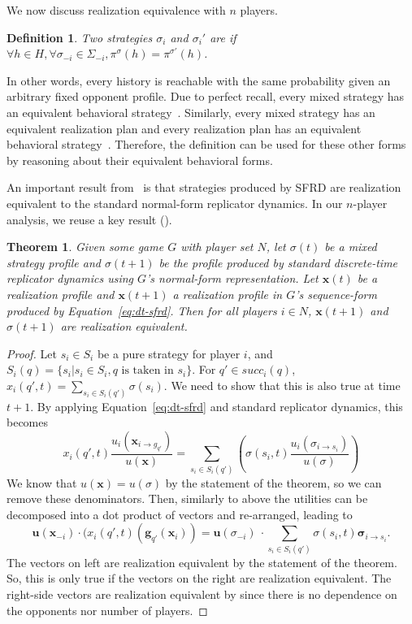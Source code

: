 \documentclass{aamas2014}
\newcommand{\bx}{\mathbf{x}}
\newcommand{\bg}{\mathbf{g}}
\newcommand{\bu}{\mathbf{u}}
\newcommand{\defword}[1]{\textbf{\boldmath{#1}}}
\newtheorem{definition}{Definition}
\newtheorem{theorem}{Theorem}
\newcommand{\todo}[1]{{\color{red}{\bf #1}}}
\begin{document}
\noindent We now discuss realization equivalence with $n$ players. 
\begin{definition}
Two strategies $\sigma_i$ and $\sigma_i'$ are \defword{realization equivalent} if 
$\forall h \in H, \forall \sigma_{-i} \in \Sigma_{-i}, \pi^{\sigma}(h) = \pi^{\sigma'}(h)$. 
\end{definition}
In other words, every history is reachable with the same probability given an arbitrary fixed opponent profile. 
Due to perfect recall, every mixed strategy has an equivalent behavioral strategy~\cite{Kuhn53}. 
Similarly, every mixed strategy has an equivalent realization plan and every realization plan has 
an equivalent behavioral strategy~\cite{SequenceFormLPs}. Therefore, the definition can be used for these 
other forms by reasoning about their equivalent behavioral forms. 

An important result from~\cite{Gatti13Efficient} is that strategies produced by SFRD are realization equivalent 
to the standard normal-form replicator dynamics. In our $n$-player analysis, we reuse a key result 
(\cite[Lemma 9]{Gatti13Efficient}).

\begin{theorem}
Given some game $G$ with player set $N$, 
let $\sigma(t)$ be a mixed strategy profile and $\sigma(t+1)$ be the profile produced by 
standard discrete-time replicator dynamics using $G$'s normal-form representation. 
Let $\bx(t)$ be a realization profile and $\bx(t+1)$ a realization profile in $G$'s sequence-form produced by 
Equation~\ref{eq:dt-sfrd}. Then for all players $i \in N$, $\bx(t+1)$ and $\sigma(t+1)$ are realization equivalent.
\end{theorem}
\begin{proof}
Let $s_i \in S_i$ be a pure strategy for player $i$, and $S_i(q) = \{ s_i | s_i \in S_i, q \mbox{ is taken in } s_i \}$.
For $q' \in succ_i(q)$, $x_i(q', t) = \sum_{s_i \in S_i(q')} \sigma(s_i)$. 
We need to show that this is also true at time $t+1$. By applying Equation~\ref{eq:dt-sfrd} and standard
replicator dynamics, this becomes
\[
  x_i(q',t) \frac{u_i(\bx_{i \rightarrow g_{q'}})}{u(\bx)} 
= \sum_{s_i \in S_i(q')} \left( \sigma(s_i,t) \frac{u_i(\sigma_{i \rightarrow s_i})}{u(\sigma)} \right)
\]
We know that $u(\bx) = u(\sigma)$ by the statement of the theorem, so we can remove these denominators.
Then, similarly to above the utilities can be decomposed into a dot product of vectors and re-arranged, leading to
\[
  \bu(\bx_{-i}) \cdot (x_i(q',t)(\bg_{q'}(\bx_i)) 
= \bu(\sigma_{-i})~\cdot \sum_{s_i \in S_i(q')} \sigma(s_i,t) \boldsymbol\sigma_{i \rightarrow s_i}.
\]
\noindent The vectors on left are realization equivalent by the statement of the theorem. So, this 
is only true if the vectors on the right are realization equivalent. The right-side vectors are realization equivalent 
by \cite[Lemma 9]{Gatti13Efficient} since there is no dependence on the opponents nor number of players. 
\end{proof}
\end{document}
